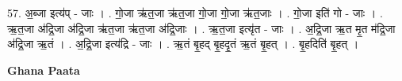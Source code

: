 \documentclass[17pt]{extarticle}
\begin{document}
57. अ॒ब्जा इत्य॑प् - जाः । . गो॒जा ऋ॑त॒जा ऋ॑त॒जा गो॒जा गो॒जा ऋ॑त॒जाः । . गो॒जा इति॑ गो - जाः । . ऋ॒त॒जा अ॑द्रि॒जा अ॑द्रि॒जा ऋ॑त॒जा ऋ॑त॒जा अ॑द्रि॒जाः । . ऋ॒त॒जा इत्यृ॑त - जाः । . अ॒द्रि॒जा ऋ॒त मृ॒त म॑द्रि॒जा अ॑द्रि॒जा ऋ॒तं । . अ॒द्रि॒जा इत्य॑द्रि - जाः । . ऋ॒तं बृ॒हद् बृ॒हदृ॒तं ऋ॒तं बृ॒हत् । . बृ॒हदिति॑ बृ॒हत् । \newline

\textbf{Ghana Paata } \newline
\end{document}
